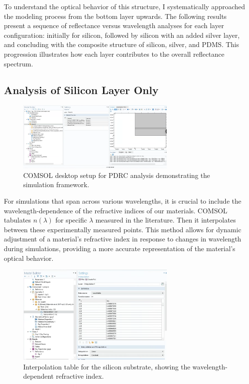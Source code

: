 To understand the optical behavior of this structure, I systematically approached the modeling process from the bottom layer upwards. The following results present a sequence of reflectance versus wavelength analyses for each layer configuration: initially for silicon, followed by silicon with an added silver layer, and concluding with the composite structure of silicon, silver, and PDMS. This progression illustrates how each layer contributes to the overall reflectance spectrum.


\subsection{Analysis of Silicon Layer Only}

\begin{figure}[H]
  \centering
  \includegraphics[width=0.7\textwidth]{Chapters/Figures/Chapter 4 Figures/COMSOL Desktop Layout for PDRC Analysis.png}
  \caption{COMSOL desktop setup for PDRC analysis demonstrating the simulation framework.}
  \label{fig:COMSOL-desktop-PDRC-setup}
\end{figure}

For simulations that span across various wavelengths, it is crucial to include the wavelength-dependence of the refractive indices of our materials. COMSOL tabulates $n(\lambda)$ for specific $\lambda$ measured in the literature. Then it interpolates between these experimentally measured points. This method allows for dynamic adjustment of a material's refractive index in response to changes in wavelength during simulations, providing a more accurate representation of the material's optical behavior.

\begin{figure}[H]
  \centering
  \includegraphics[width=0.7\textwidth]{Chapters/Figures/Chapter 4 Figures/Interpolation Table for the Silicon Substrate.png}
  \caption{Interpolation table for the silicon substrate, showing the wavelength-dependent refractive index.}
  \label{fig:interpolation-table-silicon}
\end{figure}

